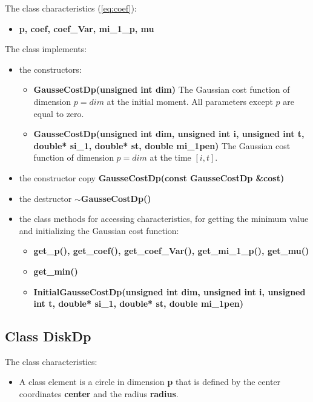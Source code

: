 \documentclass{report}
\begin{document}
	The class characteristics (\ref{eq:coef}): 
	\begin{itemize}
		\item {\bfseries p, coef, coef\_Var,  mi\_1\_p, mu}
	\end{itemize}
 
	The class implements:
	\begin{itemize}
	 	\item the constructors:
		\begin{itemize}
			\item {\bfseries GausseCostDp(unsigned int dim)} 
			The Gaussian cost function of dimension $p = dim$ at the initial moment. All parameters except $p$ are equal to zero. 
		
			\item {\bfseries GausseCostDp(unsigned int dim, unsigned int i, unsigned int t, double* si\_1, double* st, double mi\_1pen)} 
			The Gaussian cost function of dimension $p = dim$ at the time $[i,t]$. 
		\end{itemize}
		\item the constructor copy {\bfseries GausseCostDp(const GausseCostDp \&cost)} 	
		\item the destructor {\bfseries $\sim$GausseCostDp()}
		\item  the class methods for accessing characteristics, for getting the minimum value and initializing the Gaussian cost function:
		\begin{itemize}
			\item  {\bfseries get\_p(), get\_coef(), get\_coef\_Var(), get\_mi\_1\_p(), \bfseries get\_mu()}
			\item {\bfseries get\_min()} 	
			\item {\bfseries InitialGausseCostDp(unsigned int dim, unsigned int i, unsigned int t, double* si\_1, double* st, double mi\_1pen)}
		\end{itemize}
	\end{itemize} 

	\subsection*{Class DiskDp}
	\label{DiskDp}
	
	The class characteristics: 
	\begin{itemize}
		\item 	A class element is a circle in dimension  {\bfseries p} that is defined by the center coordinates {\bfseries center} and the radius {\bfseries radius}.
	\end{itemize}
\end{document}
